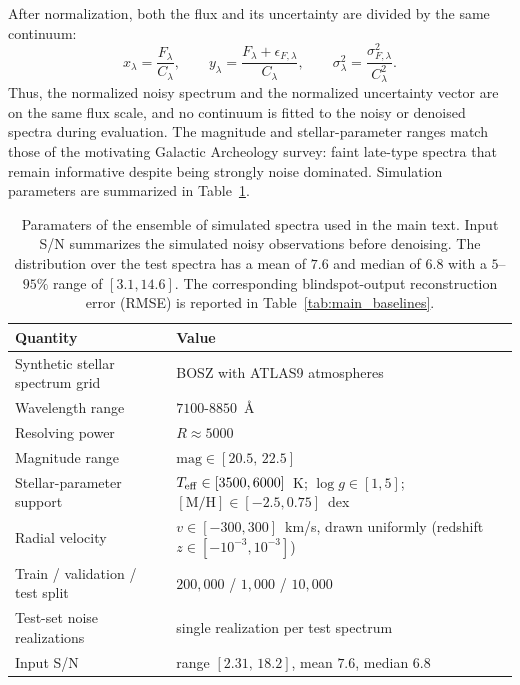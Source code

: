\documentclass[twocolumn]{aastex7}
\begin{document}
After normalization, both the flux and its uncertainty are divided by the same continuum:
\begin{equation}
    x_{\lambda}=\frac{F_{\lambda}}{C_{\lambda}},
    \qquad
    y_{\lambda}=\frac{F_{\lambda}+\epsilon_{F,\lambda}}{C_{\lambda}},
    \qquad
    \sigma_{\lambda}^{2}
    =
    \frac{\sigma_{F,\lambda}^{2}}{C_{\lambda}^{2}}.
    \label{eq:continuum_noise_scaling}
\end{equation}
Thus, the normalized noisy spectrum and the normalized uncertainty vector are on the same flux scale, and no continuum is fitted to the noisy or denoised spectra during evaluation. The magnitude and stellar-parameter ranges match those of the motivating Galactic Archeology survey: faint late-type spectra that remain informative despite being strongly noise dominated. Simulation parameters are summarized in Table~\ref{tab:data_summary}.

\begin{table}
    \centering
    \small
    \setlength{\tabcolsep}{4pt}
    \caption{Paramaters of the ensemble of simulated spectra used in the main text. Input S/N summarizes the simulated noisy observations before denoising. The distribution over the test spectra has a mean of $7.6$ and median of $6.8$ with a $5$--$95\%$ range of $[3.1,14.6]$. The corresponding blindspot-output reconstruction error (RMSE) is reported in Table~\ref{tab:main_baselines}.}
    \begin{tabular}{ll}
    \hline
    \textbf{Quantity} & \textbf{Value} \\
    \hline
    Synthetic stellar spectrum grid & BOSZ with ATLAS9 atmospheres \\
    Wavelength range & $7100$-$8850$~\AA \\
    Resolving power & $R \approx 5000$ \\
    Magnitude range & $\mathrm{mag} \in [20.5,\,22.5]$ \\
    Stellar-parameter support & $T_{\rm eff}\in[3500,6000]$~K; $\log g\in[1,5]$; $[\mathrm{M}/\mathrm{H}]\in[-2.5,0.75]$~dex \\
    Radial velocity & $v\in[-300,300]$~km/s, drawn uniformly (redshift $z\in[-10^{-3},10^{-3}]$) \\
    Train / validation / test split & $200{,}000$ / $1{,}000$ / $10{,}000$ \\
    Test-set noise realizations & single realization per test spectrum \\
    Input S/N
    & range $[2.31,\,18.2]$, mean $7.6$, median $6.8$ \\
    \hline
    \end{tabular}
    \label{tab:data_summary}
\end{table}
\end{document}

